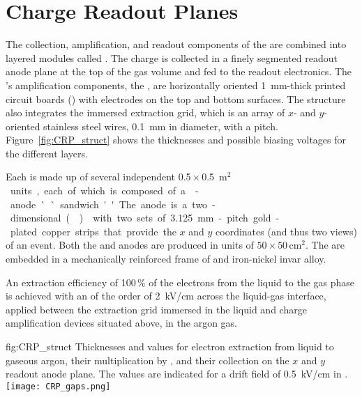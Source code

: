 \section{Charge Readout Planes}
\label{sec:dp-execsum-crp}

The  collection, amplification, and readout components of the  are combined into  layered modules called . The charge is collected in a finely segmented readout anode plane at the top of the gas volume and fed to the  readout electronics. The  's amplification components, the , are horizontally oriented \SI{1}{mm}-thick printed circuit boards () with electrodes on the top and bottom surfaces.  
The  structure also integrates the immersed extraction grid, which is an array of $x$- and $y$-oriented stainless steel wires, \SI{0.1}{mm} in diameter, with a \dpstrippitch pitch. Figure~\ref{fig:CRP_struct} shows the thicknesses and possible biasing voltages for the different  layers.

Each  is made up of several independent \num{0.5}\,$\times$\,\SI{0.5}{m$^2$} units, each of which is composed  of a -anode ``sandwich.''  
The anode is a two-dimensional (\twod)  with two sets of \SI{3.125}{mm}-pitch gold-plated copper strips that provide the $x$ and $y$ coordinates (and thus two views) of an event. Both the  and anodes are produced in units of $50 \times 50\, $cm$^2$. 
The  are embedded in a mechanically reinforced frame of \frfour and iron-nickel invar alloy. 

An extraction efficiency of \num{100}\,\% of the electrons from the liquid to the gas phase is achieved with an \efield of the order of \SI{2}{kV/cm} across the liquid-gas interface, applied between the  extraction grid immersed in the liquid and charge amplification devices situated above, in the argon gas. 

\begin{dunefigure}{fig:CRP_struct}
{Thicknesses and  values for electron extraction from liquid to gaseous argon, their  multiplication by , and their collection on the $x$ and $y$ readout anode plane. The  values are indicated for a drift field of \SI{0.5}{kV/cm} in .}
\texttt{[image: CRP\_gaps.png]}
\end{dunefigure}

